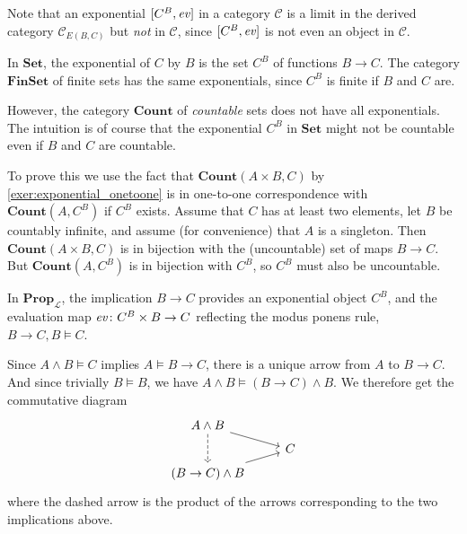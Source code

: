 \documentclass[article, a4paper, 11pt, oneside]{memoir}
\numberwithin{equation}{chapter}
\newcommand{\calL}{\mathcal{L}}
\newcommand{\cat}[1]{\mathcal{#1}}
\newcommand{\ncat}[1]{\mathbf{#1}} %
\newcommand{\catSet}{\ncat{Set}}
\newcommand{\catFinSet}{\ncat{FinSet}}
\newcommand{\catProp}{\ncat{Prop}}
\newcommand{\catCount}{\ncat{Count}}
\newcommand{\catC}{\cat{C}}
\theoremstyle{myexample}
\theoremstyle{myexamplebreak}
\begin{document}
Note that an exponential $[C^B, \mathit{ev}]$ in a category $\catC$ is a limit in the derived category $\catC_{E(B,C)}$ but \emph{not} in $\catC$, since $[C^B, \mathit{ev}]$ is not even an object in $\catC$.


\begin{examplebreak}
    \begin{enumexample}
        \item In $\catSet$, the exponential of $C$ by $B$ is the set $C^B$ of functions $B \to C$. The category $\catFinSet$ of finite sets has the same exponentials, since $C^B$ is finite if $B$ and $C$ are.
        
        \item However, the category $\catCount$ of \emph{countable} sets does not have all exponentials. The intuition is of course that the exponential $C^B$ in $\catSet$ might not be countable even if $B$ and $C$ are countable.
        
        To prove this we use the fact that $\catCount(A \times B, C)$ by \cref{exer:exponential_onetoone} is in one-to-one correspondence with $\catCount(A, C^B)$ if $C^B$ exists. Assume that $C$ has at least two elements, let $B$ be countably infinite, and assume (for convenience) that $A$ is a singleton. Then $\catCount(A \times B, C)$ is in bijection with the (uncountable) set of maps $B \to C$. But $\catCount(A, C^B)$ is in bijection with $C^B$, so $C^B$ must also be uncountable.

        \item In $\catProp_\calL$, the implication $B \to C$ provides an exponential object $C^B$, and the evaluation map $\mathit{ev} \colon C^B \times B \to C$ reflecting the modus ponens rule, $B \to C, B \vDash C$.
        
        Since $A \land B \vDash C$ implies $A \vDash B \to C$, there is a unique arrow from $A$ to $B \to C$. And since trivially $B \vDash B$, we have $A \land B \vDash (B \to C) \land B$. We therefore get the commutative diagram
        \begin{equation*}
            \begin{tikzcd}[row sep=tiny]
                A \land B
                    \ar[dd, dashed]
                    \ar[dr]
                \\
                & C
                \\
                (B \to C) \land B
                    \ar[ur]
            \end{tikzcd}
        \end{equation*}
        where the dashed arrow is the product of the arrows corresponding to the two implications above.
    \end{enumexample}
\end{examplebreak}
\end{document}
